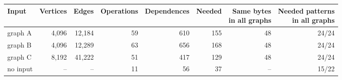 \begin{tabular}{lrrrrrrr}
\toprule
Input & Vertices & Edges & Operations & Dependences & Needed & \shortstack{Same bytes\\in all graphs} & \shortstack{Needed patterns\\in all graphs} \\
\midrule
graph A & 4,096 & 12,184 & 59 & 610 & 155 & 48 & 24/24 \\
graph B & 4,096 & 12,289 & 63 & 656 & 168 & 48 & 24/24 \\
graph C & 8,192 & 41,222 & 51 & 417 & 129 & 48 & 24/24 \\
no input & -- & -- & 11 & 56 & 37 & -- & 15/22 \\
\bottomrule
\end{tabular}
